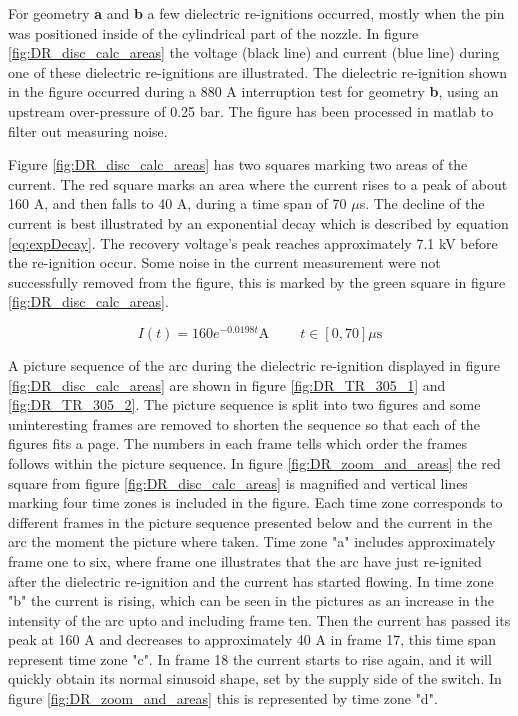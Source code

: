 \documentclass[10pt,b5paper,twoside]{article}
\begin{document}
For geometry \textbf{a} and \textbf{b} a few dielectric re-ignitions occurred, mostly when the pin was positioned inside of the cylindrical part of the nozzle. In figure \ref{fig:DR_disc_calc_areas} the voltage (black line) and current (blue line) during one of these dielectric re-ignitions are illustrated. The dielectric re-ignition shown in the figure occurred during a 880 A interruption test for geometry \textbf{b}, using an upstream over-pressure of 0.25 bar. The figure has been processed in matlab to filter out measuring noise.

Figure \ref{fig:DR_disc_calc_areas} has two squares marking two areas of the current. The red square marks an area where the current rises to a peak of about 160 A, and then falls to 40 A, during a time span of 70 $\mu$s. The decline of the current is best illustrated by an exponential decay which is described by equation \eqref{eq:expDecay}. The recovery voltage's peak reaches approximately 7.1 kV before the re-ignition occur. Some noise in the current measurement were not successfully removed from the figure, this is marked by the green square in figure \ref{fig:DR_disc_calc_areas}.

\begin{equation} \label{eq:expDecay}
I(t)=160e^{-0.0198t} \mathrm{A} \ \ \ \ \ \ \ \ \ \ t \in [0,70] \mu \mathrm{s}
\end{equation}

A picture sequence of the arc during the dielectric re-ignition displayed in figure \ref{fig:DR_disc_calc_areas} are shown in figure \ref{fig:DR_TR_305_1} and \ref{fig:DR_TR_305_2}. The picture sequence is split into two figures and some uninteresting frames are removed to shorten the sequence so that each of the figures fits a page. The numbers in each frame tells which order the frames follows within the picture sequence. In figure \ref{fig:DR_zoom_and_areas} the red square from figure \ref{fig:DR_disc_calc_areas} is magnified and vertical lines marking four time zones is included in the figure. Each time zone corresponds to different frames in the picture sequence presented below and the current in the arc the moment the picture where taken. Time zone "a" includes approximately frame one to six, where frame one illustrates that the arc have just re-ignited after the dielectric re-ignition and the current has started flowing. In time zone "b" the current is rising, which can be seen in the pictures as an increase in the intensity of the arc upto and including frame ten. Then the current has passed its peak at 160 A and decreases to approximately 40 A in frame 17, this time span represent time zone "c". In frame 18 the current starts to rise again, and it will quickly obtain its normal sinusoid shape, set by the supply side of the switch. In figure \ref{fig:DR_zoom_and_areas} this is represented by time zone "d".
\end{document}

